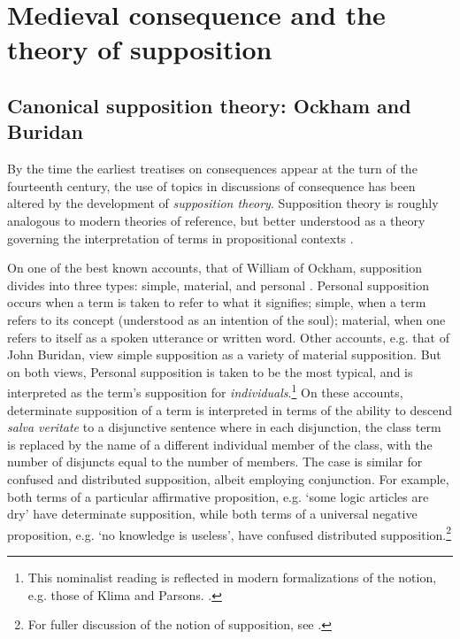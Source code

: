 \documentclass[a4paper, 11pt]{article}
\begin{document}
\section{Medieval consequence and the theory of supposition}
\subsection{Canonical supposition theory: Ockham and Buridan}
By the time the earliest treatises on consequences appear at the turn of the fourteenth century, the use of topics in discussions of consequence has been  altered by the development of \emph{supposition theory}. Supposition theory is roughly analogous to modern theories of reference, but better understood as a theory governing the interpretation of terms in propositional contexts \autocite{DutilhNovaes2007,DutilhNovaes2008b}. 

On one of the best known accounts, that of William of Ockham, supposition divides into three types: simple, material, and personal \autocite[193-197]{OckhamSL}. Personal supposition occurs when a term is taken to refer to what it signifies; simple,  when a term refers to its concept (understood as an intention of the soul); material, when one refers to itself as a spoken utterance or written word. Other accounts, e.g. that of John Buridan, view simple supposition as a variety of material supposition. But on both views, Personal supposition is taken to be the most typical, and is interpreted as the term's supposition for \emph{individuals}.\footnote{This nominalist reading is reflected in modern formalizations of the notion, e.g. those of Klima and Parsons. \autocite{Klima1988,Parsons2014}.} On these accounts, determinate supposition of a term is interpreted in terms of the ability to descend \emph{salva veritate} to a disjunctive sentence where in each disjunction, the class term is replaced by the name of a different individual member of the class, with the number of disjuncts equal to the number of members. The case is similar for confused and distributed supposition, albeit employing conjunction. For example, both terms of a particular affirmative proposition, e.g. `some logic articles are dry' have determinate supposition, while both terms of a universal negative proposition, e.g. `no knowledge is useless', have confused distributed supposition.\footnote{For fuller discussion of the notion of supposition, see \autocite{Klima1988,PriestRead1977,HodgesBurley,Parsons2014}.}

\end{document}
